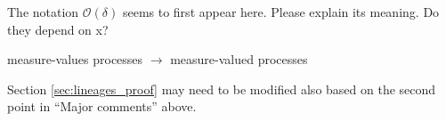 
\begin{point}{\revref}
The notation $\mathcal{O}(\delta)$ seems to first appear here. Please explain its meaning. Do they
depend on x?
\end{point}


\begin{point}{\revref}
measure-values processes $\to$ measure-valued processes
\end{point}

\reply{
}

\begin{point}{}
Section \ref{sec:lineages_proof} may need to be modified also based on the second point in ``Major
comments'' above.
\end{point}

\reply{
}

